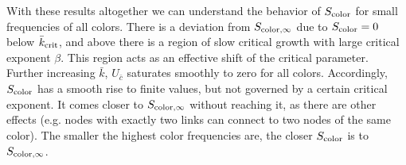 \documentclass[aps, pre, onecolumn, a4paper, floatfix]{revtex4}
\begin{document}
With these results altogether we can understand the behavior of $S_{\rm color}$ 
for small frequencies of all colors. There is a deviation 
from $S_{{\rm color},\infty}$ due to $S_{\rm color}=0$ below ${\bar k}_{\rm crit}$, and 
above there is a region of slow critical growth with large critical exponent $\beta$. This region acts as an effective 
shift of the critical parameter. Further increasing $\bar k$, $U_{\bar c}$ saturates smoothly to zero for all colors. 
Accordingly, $S_{\rm color}$ has a smooth rise to finite values, but not governed by a certain critical exponent. 
It comes closer to $S_{{\rm color},\infty}$ without reaching it, as there are other effects (e.g. nodes with 
exactly two links can connect to two nodes of the same color). The smaller the highest color frequencies are, 
the closer $S_{\rm color}$ is to $S_{{\rm color},\infty}$.







\end{document}
